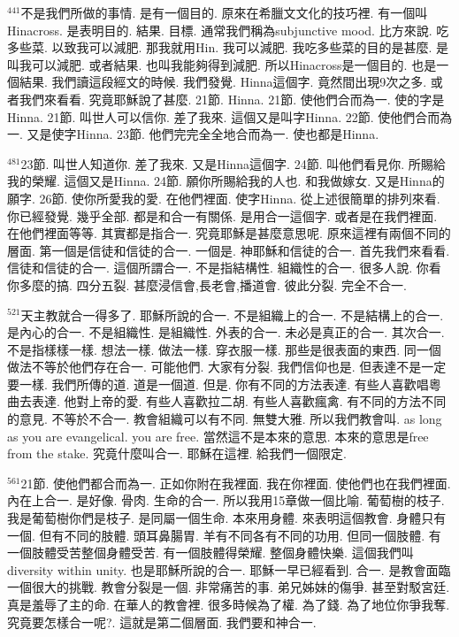\documentclass{book}
\begin{document}
$^{441}$不是我們所做的事情.
是有一個目的.
原來在希臘文文化的技巧裡.
有一個叫Hinacross.
是表明目的.
結果.
目標.
通常我們稱為subjunctive mood.
比方來說.
吃多些菜.
以致我可以減肥.
那我就用Hin.
我可以減肥.
我吃多些菜的目的是甚麼.
是叫我可以減肥.
或者結果.
也叫我能夠得到減肥.
所以Hinacross是一個目的.
也是一個結果.
我們讀這段經文的時候.
我們發覺.
Hinna這個字.
竟然間出現9次之多.
或者我們來看看.
究竟耶穌說了甚麼.
21節.
Hinna.
21節.
使他們合而為一.
使的字是Hinna.
21節.
叫世人可以信你.
差了我來.
這個又是叫字Hinna.
22節.
使他們合而為一.
又是使字Hinna.
23節.
他們完完全全地合而為一.
使也都是Hinna.

$^{481}$23節.
叫世人知道你.
差了我來.
又是Hinna這個字.
24節.
叫他們看見你.
所賜給我的榮耀.
這個又是Hinna.
24節.
願你所賜給我的人也.
和我做嫁女.
又是Hinna的願字.
26節.
使你所愛我的愛.
在他們裡面.
使字Hinna.
從上述很簡單的排列來看.
你已經發覺.
幾乎全部.
都是和合一有關係.
是用合一這個字.
或者是在我們裡面.
在他們裡面等等.
其實都是指合一.
究竟耶穌是甚麼意思呢.
原來這裡有兩個不同的層面.
第一個是信徒和信徒的合一.
一個是.
神耶穌和信徒的合一.
首先我們來看看.
信徒和信徒的合一.
這個所謂合一.
不是指結構性.
組織性的合一.
很多人說.
你看你多麼的搞.
四分五裂.
甚麼浸信會,長老會,播道會.
彼此分裂.
完全不合一.

$^{521}$天主教就合一得多了.
耶穌所說的合一.
不是組織上的合一.
不是結構上的合一.
是內心的合一.
不是組織性.
是組織性.
外表的合一.
未必是真正的合一.
其次合一.
不是指樣樣一樣.
想法一樣.
做法一樣.
穿衣服一樣.
那些是很表面的東西.
同一個做法不等於他們存在合一.
可能他們.
大家有分裂.
我們信仰也是.
但表達不是一定要一樣.
我們所傳的道.
道是一個道.
但是.
你有不同的方法表達.
有些人喜歡唱粵曲去表達.
他對上帝的愛.
有些人喜歡拉二胡.
有些人喜歡瘋禽.
有不同的方法不同的意見.
不等於不合一.
教會組織可以有不同.
無雙大雅.
所以我們教會叫.
as long as you are evangelical.
you are free.
當然這不是本來的意思.
本來的意思是free from the stake.
究竟什麼叫合一.
耶穌在這裡.
給我們一個限定.

$^{561}$21節.
使他們都合而為一.
正如你附在我裡面.
我在你裡面.
使他們也在我們裡面.
內在上合一.
是好像.
骨肉.
生命的合一.
所以我用15章做一個比喻.
葡萄樹的枝子.
我是葡萄樹你們是枝子.
是同屬一個生命.
本來用身體.
來表明這個教會.
身體只有一個.
但有不同的肢體.
頭耳鼻腸胃.
羊有不同各有不同的功用.
但同一個肢體.
有一個肢體受苦整個身體受苦.
有一個肢體得榮耀.
整個身體快樂.
這個我們叫diversity within unity.
也是耶穌所說的合一.
耶穌一早已經看到.
合一.
是教會面臨一個很大的挑戰.
教會分裂是一個.
非常痛苦的事.
弟兄姊妹的傷爭.
甚至對駁宮廷.
真是羞辱了主的命.
在華人的教會裡.
很多時候為了權.
為了錢.
為了地位你爭我奪.
究竟要怎樣合一呢?.
這就是第二個層面.
我們要和神合一.
\end{document}

